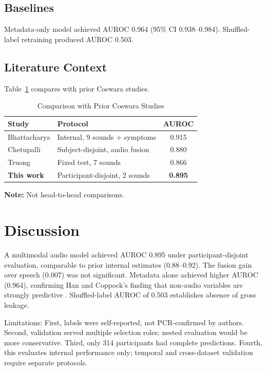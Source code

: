 \documentclass[conference]{IEEEtran}
\begin{document}
\subsection{Baselines}

Metadata-only model achieved AUROC 0.964 (95\% CI 0.938--0.984). Shuffled-label retraining produced AUROC 0.503.

\subsection{Literature Context}

Table~\ref{tab:context} compares with prior Coswara studies.

\begin{table}[!t]
\caption{Comparison with Prior Coswara Studies}
\label{tab:context}
\centering
\footnotesize
\begin{tabular}{llc}
\toprule
Study & Protocol & AUROC \\
\midrule
Bhattacharya \cite{bhattacharya2023coswara} & Internal, 9 sounds + symptoms & 0.915 \\
Chetupalli \cite{chetupalli2023multimodal} & Subject-disjoint, audio fusion & 0.880 \\
Truong \cite{truong2024fair} & Fixed test, 7 sounds & 0.866 \\
\midrule
\textbf{This work} & Participant-disjoint, 2 sounds & \textbf{0.895} \\
\bottomrule
\end{tabular}
\par\vspace{1pt}\scriptsize \textbf{Note:} Not head-to-head comparisons.
\end{table}

\section{Discussion}

A multimodal audio model achieved AUROC 0.895 under participant-disjoint evaluation, comparable to prior internal estimates (0.88--0.92). The fusion gain over speech (0.007) was not significant. Metadata alone achieved higher AUROC (0.964), confirming Han and Coppock's finding that non-audio variables are strongly predictive \cite{han2022realistic,coppock2024audio}. Shuffled-label AUROC of 0.503 establishes absence of gross leakage.

Limitations: First, labels were self-reported, not PCR-confirmed by authors. Second, validation served multiple selection roles; nested evaluation would be more conservative. Third, only 314 participants had complete predictions. Fourth, this evaluates internal performance only; temporal and cross-dataset validation require separate protocols.
\end{document}
